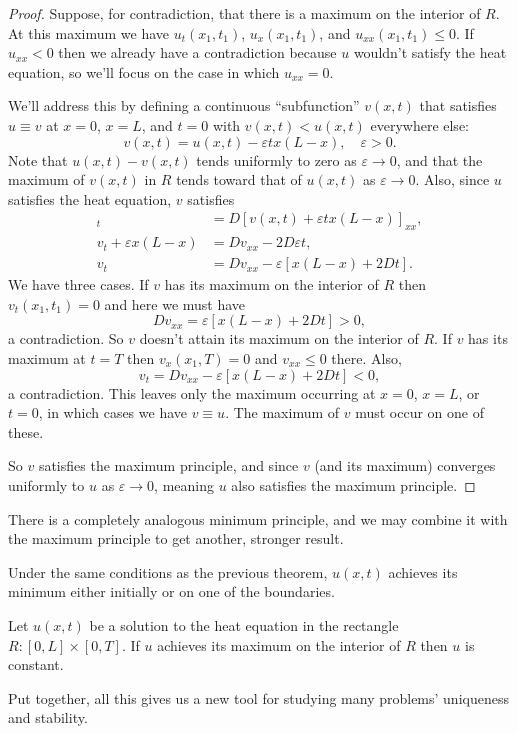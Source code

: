\documentclass[../m180main.tex]{subfiles}
\begin{document}
\begin{proof}
    Suppose, for contradiction, that there is a maximum on the interior of $R$.
    At this maximum we have $u_t(x_1, t_1)$, $u_x(x_1, t_1)$, and $u_{xx}(x_1, t_1) \leq 0$.
    If $u_{xx} < 0$ then we already have a contradiction because $u$ wouldn't satisfy the heat equation, so we'll focus on the case in which $u_{xx} = 0$.

    We'll address this by defining a continuous ``subfunction'' $v(x,t)$ that satisfies $u \equiv v$ at $x=0$, $x=L$, and $t=0$ with $v(x,t) < u(x,t)$ everywhere else:
    \[ v(x,t) = u(x,t) - \varepsilon t x (L - x), \quad \varepsilon > 0. \]
    Note that $u(x,t) - v(x,t)$ tends uniformly to zero as $\varepsilon \to 0$, and that the maximum of $v(x,t)$ in $R$ tends toward that of $u(x,t)$ as $\varepsilon \to 0$.
    Also, since $u$ satisfies the heat equation, $v$ satisfies
    \begin{align*}
        [v(x,t) + \varepsilon t x (L - x)]_t &= D [v(x,t) + \varepsilon t x (L - x)]_{xx}, \\
        v_t + \varepsilon x(L-x) &= Dv_{xx} - 2D \varepsilon t, \\
        v_t &= Dv_{xx} - \varepsilon [x(L-x) + 2Dt].
    \end{align*}
    We have three cases.
    If $v$ has its maximum on the interior of $R$ then $v_t(x_1,t_1) = 0$ and here we must have
    \[ Dv_{xx} = \varepsilon [x(L-x) + 2Dt] > 0, \]
    a contradiction.
    So $v$ doesn't attain its maximum on the interior of $R$.
    If $v$ has its maximum at $t = T$ then $v_x(x_1, T) = 0$ and $v_{xx} \leq 0$ there.
    Also, 
    \[ v_t = Dv_{xx} - \varepsilon [x(L-x) + 2Dt] < 0, \]
    a contradiction.
    This leaves only the maximum occurring at $x=0$, $x=L$, or $t=0$, in which cases we have $v \equiv u$.
    The maximum of $v$ must occur on one of these.

    So $v$ satisfies the maximum principle, and since $v$ (and its maximum) converges uniformly to $u$ as $\varepsilon \to 0$, meaning $u$ also satisfies the maximum principle.
\end{proof}

There is a completely analogous minimum principle, and we may combine it with the maximum principle to get another, stronger result.

\begin{theorem}
    Under the same conditions as the previous theorem, $u(x,t)$ achieves its minimum either initially or on one of the boundaries.
\end{theorem}

\begin{theorem}
    Let $u(x,t)$ be a solution to the heat equation in the rectangle $R : [0,L] \times [0,T]$.
    If $u$ achieves its maximum on the interior of $R$ then $u$ is constant.
\end{theorem}

Put together, all this gives us a new tool for studying many problems' uniqueness and stability.
\end{document}
